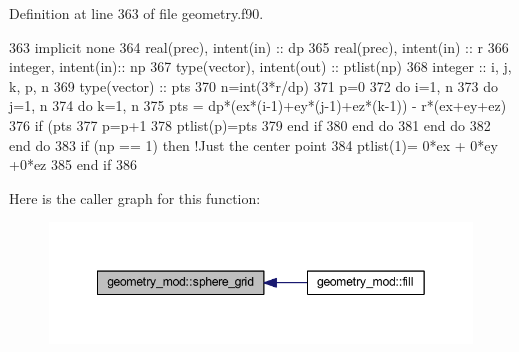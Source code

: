 Definition at line 363 of file geometry.\+f90.


\begin{DoxyCode}
363     \textcolor{keywordtype}{implicit none}
364     \textcolor{keywordtype}{real(prec)}, \textcolor{keywordtype}{intent(in)} :: dp
365     \textcolor{keywordtype}{real(prec)}, \textcolor{keywordtype}{intent(in)} :: r
366     \textcolor{keywordtype}{integer}, \textcolor{keywordtype}{intent(in)}::  np
367     \textcolor{keywordtype}{type}(vector), \textcolor{keywordtype}{intent(out)} :: ptlist(np)
368     \textcolor{keywordtype}{integer} :: i, j, k, p, n
369     \textcolor{keywordtype}{type}(vector) :: pts
370     n=int(3*r/dp)
371     p=0
372     \textcolor{keywordflow}{do} i=1, n
373         \textcolor{keywordflow}{do} j=1, n
374             \textcolor{keywordflow}{do} k=1, n
375                 pts = dp*(ex*(i-1)+ey*(j-1)+ez*(k-1)) - r*(ex+ey+ez)
376                 \textcolor{keywordflow}{if} (pts%
377                     p=p+1
378                     ptlist(p)=pts
379 \textcolor{keywordflow}{                end if}
380 \textcolor{keywordflow}{            end do}
381 \textcolor{keywordflow}{        end do}
382 \textcolor{keywordflow}{    end do}
383     \textcolor{keywordflow}{if} (np == 1) \textcolor{keywordflow}{then} \textcolor{comment}{!Just the center point}
384         ptlist(1)= 0*ex + 0*ey +0*ez
385 \textcolor{keywordflow}{    end if}
386 
\end{DoxyCode}
Here is the caller graph for this function\+:\nopagebreak
\begin{figure}[H]
\begin{center}
\leavevmode
\includegraphics[width=349pt]{namespacegeometry__mod_a6c03a4ea3de6763940396dbeb3908ebc_icgraph}
\end{center}
\end{figure}
\mbox{\label{namespacegeometry__mod_a05de7940b4e7df5a2b31f3d0414e3743}} 
